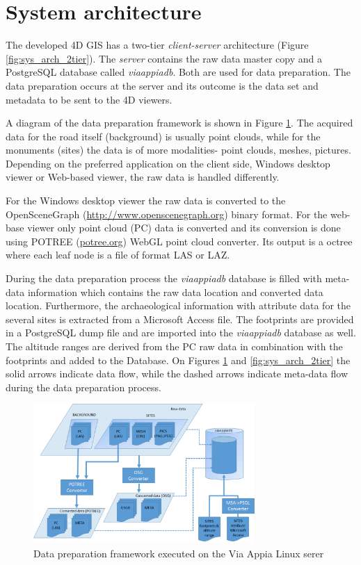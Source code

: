 \section{System architecture}
\label{sec:sys_arch}

The developed 4D GIS has a two-tier {\em client-server} architecture
(Figure \ref{fig:sys_arch_2tier}). The {\em server} contains the raw data master
copy and a PostgreSQL database called \textit{viaappiadb}. Both are used
for data preparation. The data preparation occurs at the server and its outcome
is the data set and metadata to be sent to the 4D viewers.

A diagram of the data preparation framework is shown in Figure \ref{fig:sys_arch_data_framework}.
The acquired data for the road itself (background) is usually point clouds,
while for the monuments (sites) the data is of more modalities- point clouds,
meshes, pictures. Depending on the preferred application on the client side,
Windows desktop viewer or Web-based viewer, the raw data is handled differently.

For the Windows desktop viewer the raw data is converted to the OpenSceneGraph
(\url{http://www.openscenegraph.org}) binary format. For the web-base viewer only
point cloud (PC) data is converted and its conversion is done using POTREE (\url{potree.org}) WebGL point
cloud converter. Its output is a octree where each leaf node is a file of format LAS
or LAZ. 

During the data preparation process the \textit{viaappiadb} database is filled with
meta-data information which contains the raw data location and converted data location.
Furthermore, the archaeological information with attribute data for the several sites
is extracted from a Microsoft Access file. The footprints are provided in a PostgreSQL
dump file and are imported into the \textit{viaappiadb} database as well. The altitude
ranges are derived from the PC raw data in combination with the footprints and added
to the Database. On Figures \ref{fig:sys_arch_data_framework} and \ref{fig:sys_arch_2tier}
the solid arrows indicate data flow, while the dashed arrows indicate meta-data flow
during the data preparation process.

\begin{figure}[H] \centering
\includegraphics[width=0.75\textwidth]{fig/system_architecture/DataFramework.pdf}
\caption{Data preparation framework executed on the Via Appia Linux serer}
\label{fig:sys_arch_data_framework} \end{figure}

